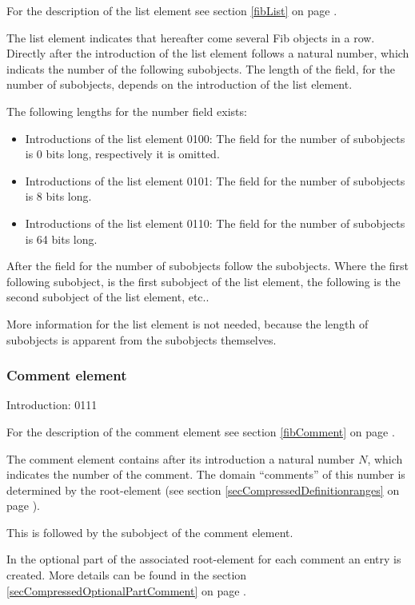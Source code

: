 \bigskip\noindent
For the description of the list element see section \ref{fibList} on page \pageref{fibList} .

The list element indicates that hereafter come several Fib objects in a row. Directly after the introduction of the list element follows a natural number, which indicats the number of the following subobjects. The length of the field, for the number of subobjects, depends on the introduction of the list element.

\bigskip\noindent
The following lengths for the number field exists:
\begin{itemize}
 \item Introductions of the list element 0100: The field for the number of subobjects is 0 bits long, respectively it is omitted.
 \item Introductions of the list element 0101: The field for the number of subobjects is 8 bits long.
 \item Introductions of the list element 0110: The field for the number of subobjects is 64 bits long.
\end{itemize}

After the field for the number of subobjects follow the subobjects. Where the first following subobject, is the first subobject of the list element, the following is the second subobject of the list element, etc..

More information for the list element is not needed, because the length of subobjects is apparent from the subobjects themselves.


\subsubsection{Comment element}
\label{secCompressedComments}

Introduction: 0111

\bigskip\noindent
For the description of the comment element see section \ref{fibComment} on page \pageref{fibComment} .

The comment element contains after its introduction a natural number $N$, which indicates the number of the comment. The domain ``comments'' of this number is determined by the root-element (see section \ref{secCompressedDefinitionranges} on page \pageref{secCompressedDefinitionranges}).

This is followed by the subobject of the comment element.

In the optional part of the associated root-element for each comment an entry is created. More details can be found in the section \ref{secCompressedOptionalPartComment} on page \pageref{secCompressedOptionalPartComment} .


